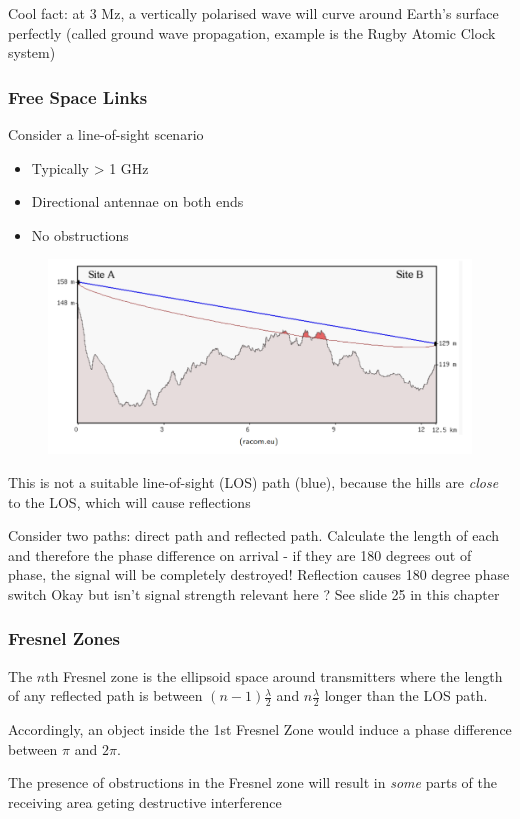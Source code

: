 \documentclass[12pt]{article}
\begin{document}
Cool fact: at 3 Mz, a vertically polarised wave will curve around Earth's surface perfectly (called ground wave propagation, example is the Rugby Atomic Clock system)

\subsubsection{Free Space Links}
Consider a line-of-sight scenario
\begin{itemize}[noitemsep]
    \item Typically > 1 GHz
    \item Directional antennae on both ends
    \item No obstructions
\end{itemize}
\begin{figure}[h!]
    \centering
    \includegraphics[width=0.5\linewidth]{images/image5.png}
\end{figure}
This is not a suitable line-of-sight (LOS) path (blue), because the hills are \textit{close} to the LOS, which will cause reflections

Consider two paths: direct path and reflected path. Calculate the length of each and therefore the phase difference on arrival - if they are 180 degrees out of phase, the signal will be completely destroyed! Reflection causes 180 degree phase switch
Okay but isn't signal strength relevant here ?
See slide 25 in this chapter

\subsubsection{Fresnel Zones}
The $n$th Fresnel zone is the ellipsoid space around transmitters where the length of any reflected path is between $(n-1)\frac{\lambda}{2}$ and $n\frac{\lambda}{2}$ longer than the LOS path.

Accordingly, an object inside the 1st Fresnel Zone would induce a phase difference between $\pi$ and $2\pi$.

The presence of obstructions in the Fresnel zone will result in \textit{some} parts of the receiving area geting destructive interference
\end{document}
